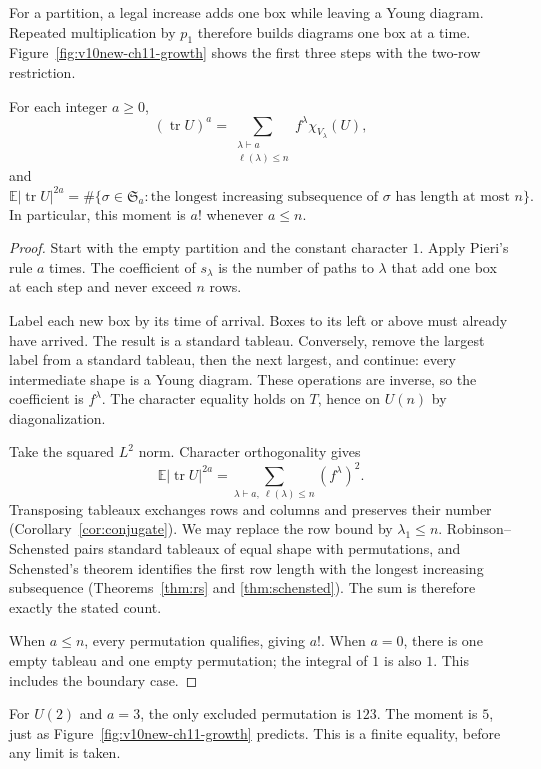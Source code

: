 For a partition, a legal increase adds one box while leaving a Young diagram. Repeated multiplication by $p_1$ therefore builds diagrams one box at a time. Figure~\ref{fig:v10new-ch11-growth} shows the first three steps with the two-row restriction.

\begin{theorem}\label{thm:traces}
For each integer $a\ge0$,
\[
(\operatorname{tr}U)^a
=\sum_{\substack{\lambda\vdash a\\\ell(\lambda)\le n}}
 f^\lambda\chi_{V_\lambda}(U),
\]
and
\[
\mathbb E|\operatorname{tr}U|^{2a}
=\#\{\sigma\in\mathfrak S_a:
 \text{the longest increasing subsequence of $\sigma$ has length at most $n$}\}.
\]
In particular, this moment is $a!$ whenever $a\le n$.
\end{theorem}

\begin{proof}
Start with the empty partition and the constant character $1$. Apply Pieri's rule $a$ times. The coefficient of $s_\lambda$ is the number of paths to $\lambda$ that add one box at each step and never exceed $n$ rows.

Label each new box by its time of arrival. Boxes to its left or above must already have arrived. The result is a standard tableau. Conversely, remove the largest label from a standard tableau, then the next largest, and continue: every intermediate shape is a Young diagram. These operations are inverse, so the coefficient is $f^\lambda$. The character equality holds on $T$, hence on $U(n)$ by diagonalization.

Take the squared $L^2$ norm. Character orthogonality gives
\[
\mathbb E|\operatorname{tr}U|^{2a}
=\sum_{\lambda\vdash a,\ \ell(\lambda)\le n}(f^\lambda)^2.
\]
Transposing tableaux exchanges rows and columns and preserves their number (Corollary~\ref{cor:conjugate}). We may replace the row bound by $\lambda_1\le n$. Robinson--Schensted pairs standard tableaux of equal shape with permutations, and Schensted's theorem identifies the first row length with the longest increasing subsequence (Theorems~\ref{thm:rs} and \ref{thm:schensted}). The sum is therefore exactly the stated count.

When $a\le n$, every permutation qualifies, giving $a!$. When $a=0$, there is one empty tableau and one empty permutation; the integral of $1$ is also $1$. This includes the boundary case.
\end{proof}

For $U(2)$ and $a=3$, the only excluded permutation is $123$. The moment is $5$, just as Figure~\ref{fig:v10new-ch11-growth} predicts. This is a finite equality, before any limit is taken.

